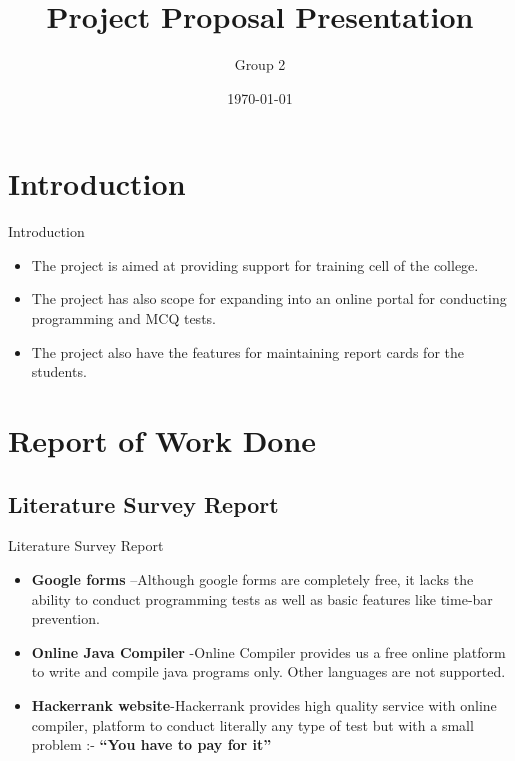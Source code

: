 \documentclass{beamer}
\title[EngineersPoint]{Project Proposal Presentation}
\author{Group 2}
\institute{CS6A}
\date{\today}
\begin{document}
\begin{frame}
  \titlepage
\end{frame}


\section{Introduction}

\begin{frame}{Introduction}
\begin{itemize}
  \item The project is aimed at providing support for training cell of the
college.
  \item The project has also scope for expanding into an online portal for
conducting programming and MCQ tests.
  \item The project also have the features for maintaining report cards for the
students.
\end{itemize}



\end{frame}

\section{Report of Work Done}

\subsection{Literature Survey Report}

\begin{frame}{Literature Survey Report}

\begin{itemize}
\item \textbf{Google forms}
–Although google forms are completely free, it lacks the ability to conduct
programming tests as well as basic features like time-bar prevention.
\item \textbf{Online Java Compiler}
-Online Compiler provides us a free online  platform to write and compile java programs only. Other languages are not supported.
\item \textbf{Hackerrank website}-Hackerrank provides high quality service with online compiler, platform to
conduct literally any type of test but with a small problem :-
\textbf{“You have to pay for it”}
\end{itemize}


\end{frame}
\end{document}
